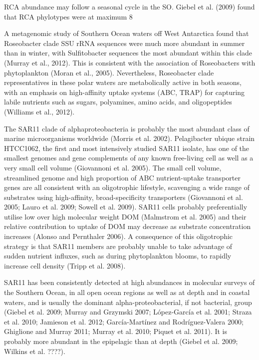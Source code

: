 RCA abundance may follow a seasonal cycle in the SO. Giebel et al. (2009) found that RCA phylotypes were at maximum 8%

A metagenomic study of Southern Ocean waters off West Antarctica found that Roseobacter clade SSU rRNA sequences were much more abundant in summer than in winter, with Sulfitobacter sequences the most abundant within this clade (Murray et al., 2012). This is consistent with the association of Roseobacters with phytoplankton (Moran et al., 2005). Nevertheless, Roseobacter clade representatives in these polar waters are metabolically active in both seasons, with an emphasis on high-affinity uptake systems (ABC, TRAP) for capturing labile nutrients such as sugars, polyamines, amino acids, and oligopeptides (Williams et al., 2012).



The SAR11 clade of alphaproteobacteria is probably the most abundant class of marine microorganisms worldwide (Morris et al. 2002). Pelagibacter ubique strain HTCC1062, the first and most intensively studied SAR11 isolate, has one of the smallest genomes and gene complements of any known free-living cell as well as a very small cell volume (Giovannoni et al. 2005). The small cell volume, streamlined genome and high proportion of ABC nutrient-uptake transporter genes are all consistent with an oligotrophic lifestyle, scavenging a wide range of substrates using high-affinity, broad-specificity transporters (Giovannoni et al. 2005; Lauro et al. 2009; Sowell et al. 2009). SAR11 cells probably preferentially utilise low over high molecular weight DOM (Malmstrom et al. 2005) and their relative contribution to uptake of DOM may decrease as substrate concentration increases (Alonso and Pernthaler 2006). A consequence of this oligotrophic strategy is that SAR11 members are probably unable to take advantage of sudden nutrient influxes, such as during phytoplankton blooms, to rapidly increase cell density (Tripp et al. 2008).

SAR11 has been consistently detected at high abundances in molecular surveys of the Southern Ocean, in all open ocean regions as well as at depth and in coastal waters, and is usually the dominant alpha-proteobacterial, if not bacterial, group (Giebel et al. 2009; Murray and Grzymski 2007; López-García et al. 2001; Straza et al. 2010; Jamieson et al. 2012; García-Martínez and Rodríguez-Valera 2000; Ghiglione and Murray 2011; Murray et al. 2010; Piquet et al. 2011). It is probably more abundant in the epipelagic than at depth (Giebel et al. 2009; Wilkins et al. ????).

